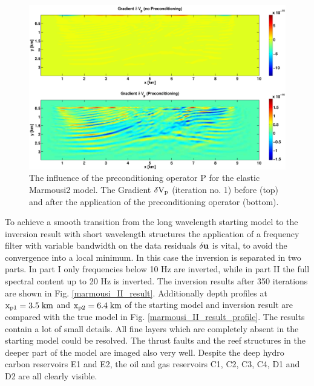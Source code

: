 \begin{figure}[!bth]
\begin{center}
\includegraphics[width=15cm]{figures/marmousi/marmousi_II_precond.pdf} 
\caption{The influence of the preconditioning operator P for the elastic Marmousi2 model. The Gradient $\rm{\delta V_p}$ (iteration no. 1) before (top) and after the application of the preconditioning operator (bottom).}
\label{marmousi_II_precond}
\end{center}
\end{figure}  
To achieve a smooth transition from the long wavelength starting model to the inversion result with short wavelength structures the application of a frequency filter with variable bandwidth on the data residuals $\rm{\delta \mathbf{u}}$ is vital, to avoid the convergence into a local minimum. In this case the inversion is separated in two parts. In part I only frequencies below 10 Hz are inverted, while in part II the full spectral content up to 20 Hz is inverted. The inversion results after 350 iterations are shown in Fig. \ref{marmousi_II_result}. Additionally depth profiles at $\rm{x_{p1}=3.5\;km}$ and $\rm{x_{p2}=6.4\;km}$ of the starting model and inversion result are compared with the true model in Fig. \ref{marmousi_II_result_profile}. The results contain a lot of small details. All fine layers which are completely absent in the starting model could be resolved. The thrust faults and the reef structures in the deeper part of the model are imaged also very well. Despite the deep hydro carbon reservoirs E1 and E2, the oil and gas reservoirs C1, C2, C3, C4, D1 and D2 are all clearly visible.
